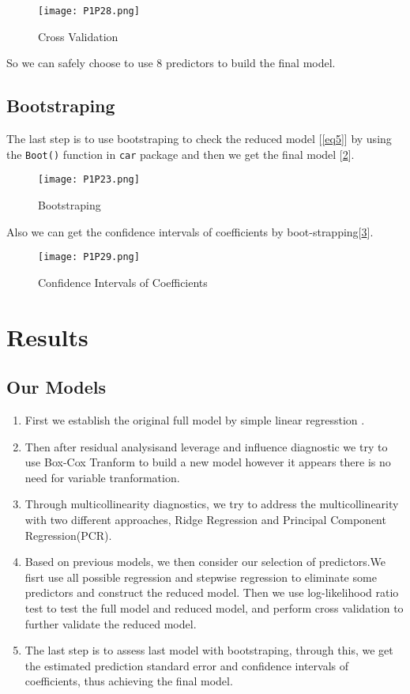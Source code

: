 \documentclass[11pt]{article}
\begin{document}
\begin{figure}[!htb]
\centering
\texttt{[image: P1P28.png]}
\caption{Cross Validation}\label{Fig24}
\end{figure}

So we can safely choose to use 8 predictors to build the final model.

\subsection{Bootstraping}\label{ch7}

The last step is to use bootstraping to check the reduced model [\ref{eq5}] by using the \verb|Boot()| function in \verb|car| package and then we get the final model [\ref{Fig20}].


\begin{figure}[!htb]
\centering
\texttt{[image: P1P23.png]}
\caption{Bootstraping}\label{Fig20}
\end{figure}
     
Also we can get the confidence intervals of coefficients by boot-strapping[\ref{Fig25}].

\begin{figure}[!htb]
\centering
\texttt{[image: P1P29.png]}
\caption{Confidence Intervals of Coefficients}\label{Fig25}
\end{figure}

\section{Results}

\subsection{Our Models}

\begin{enumerate}
	\item First we establish the original full model by simple linear regresstion .
	\item Then after residual analysisand leverage and influence diagnostic we try to use Box-Cox Tranform to build a new model however it appears there is no need for variable tranformation.
	\item Through multicollinearity diagnostics, we try to address the multicollinearity with two different approaches, Ridge Regression and Principal Component Regression(PCR).
	\item Based on previous models, we then consider our selection of predictors.We fisrt use all possible regression and stepwise regression to eliminate some predictors and construct the reduced model. Then we use log-likelihood ratio test to test the full model and reduced model, and perform cross validation to further validate the reduced model.
	\item The last step is to assess last model with bootstraping, through this, we get the estimated prediction standard error and confidence intervals of coefficients, thus achieving the final model.

\end{enumerate}
\end{document}
